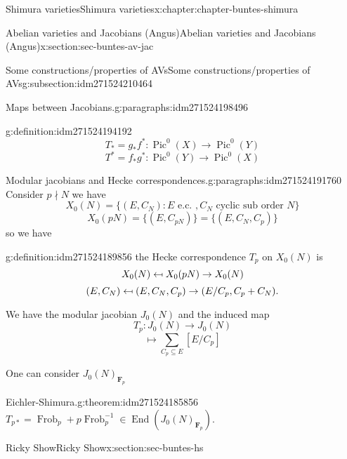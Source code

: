 \documentclass[oneside,10pt,]{book}
\numberwithin{equation}{section}
\newcommand{\inv}{^{-1}}
\providecommand\mapsfrom{\mathrel{\reflectbox{\ensuremath{\mapsto}}}}
\newcommand{\FF}{\mathbf{F}}
\DeclareMathOperator{\End}{End}
\DeclareMathOperator{\Pic}{Pic}
\DeclareMathOperator{\Frob}{Frob}
\begin{document}
\begin{chapterptx}{Shimura varieties}{}{Shimura varieties}{}{}{x:chapter:chapter-buntes-shimura}
\begin{sectionptx}{Abelian varieties and Jacobians (Angus)}{}{Abelian varieties and Jacobians (Angus)}{}{}{x:section:sec-buntes-av-jac}
\begin{subsectionptx}{Some constructions\slash{}properties of AVs}{}{Some constructions\slash{}properties of AVs}{}{}{g:subsection:idm271524210464}
\begin{paragraphs}{Maps between Jacobians.}{g:paragraphs:idm271524198496}
\begin{definition}{}{g:definition:idm271524194192}
\begin{equation*}
T_* = g_* f^* \colon \Pic^0(X) \to \Pic^0(Y)
\end{equation*}
%
\begin{equation*}
T^* = f_* g^* \colon \Pic^0(Y) \to \Pic^0(X)
\end{equation*}
%
\end{definition}
\end{paragraphs}%
\begin{paragraphs}{Modular jacobians and Hecke correspondences.}{g:paragraphs:idm271524191760}%
Consider \(p\nmid N\) we have%
\begin{equation*}
X_0(N) = \{ (E,C_N) : E\text{ e.c. }, C_N \text{ cyclic sub order } N\}
\end{equation*}
%
\begin{equation*}
X_0(pN) = \{(E,C_{pN})\} = \{(E,C_N,C_p)\}
\end{equation*}
so we have%
\begin{definition}{}{g:definition:idm271524189856}%
the Hecke correspondence \(T_p\) on \(X_0(N)\) is%
\begin{equation*}
X_0(N) \mapsfrom X_0(pN) \to X_0(N)
\end{equation*}
%
\begin{equation*}
(E,C_N)\mapsfrom (E,C_N,C_p)\to (E/C_p, C_p + C_N)\text{.}
\end{equation*}
%
\end{definition}
We have the modular jacobian \(J_0(N)\) and the induced map%
\begin{equation*}
T_p \colon J_0(N) \to J_0(N)
\end{equation*}
%
\begin{equation*}
[E] \mapsto \sum_{C_p \subseteq E} [E/C_p]
\end{equation*}
%
\par
One can consider \(J_0(N)_{\FF_p}\)%
\begin{theorem}{Eichler-Shimura.}{}{g:theorem:idm271524185856}%
\(T_{p*} = \Frob_p + p \Frob_p\inv \in \End(J_0(N)_{\FF_p})\).%
\end{theorem}
\end{paragraphs}%
\end{subsectionptx}
\end{sectionptx}
%
%
\typeout{************************************************}
\typeout{************************************************}
%
\begin{sectionptx}{Ricky Show}{}{Ricky Show}{}{}{x:section:sec-buntes-hs}
%
%
\typeout{************************************************}

\end{sectionptx}
\end{chapterptx}
\end{document}
